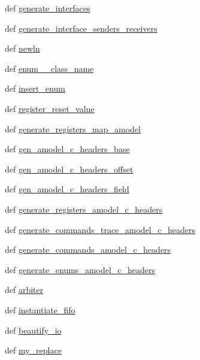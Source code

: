 \begin{DoxyCompactItemize}
\item 
def \hyperlink{namespaceverilog__generator_adc59aa695fe42f246df0ff8a0c3e785d}{generate\-\_\-interfaces}
\item 
def \hyperlink{namespaceverilog__generator_a6e58e2b5b632223307b65b5e8cd51028}{generate\-\_\-interface\-\_\-senders\-\_\-receivers}
\item 
def \hyperlink{namespaceverilog__generator_adb69d2091eb978318f0c6fc718fb13a4}{newln}
\item 
def \hyperlink{namespaceverilog__generator_a9e251dc21817ef0d79de794d38318fbb}{enum\-\_\-\_\-class\-\_\-name}
\item 
def \hyperlink{namespaceverilog__generator_a6cc005646e92f8b0aeeed3f441cdfa11}{insert\-\_\-enum}
\item 
def \hyperlink{namespaceverilog__generator_a1510db3a4ad74101fa56687347987bda}{register\-\_\-reset\-\_\-value}
\item 
def \hyperlink{namespaceverilog__generator_aa1702bb61a8a284ceb782528501d58b7}{generate\-\_\-registers\-\_\-map\-\_\-amodel}
\item 
def \hyperlink{namespaceverilog__generator_a3c57a6c2e7b44997ebc77a9705f56ec6}{gen\-\_\-amodel\-\_\-c\-\_\-headers\-\_\-base}
\item 
def \hyperlink{namespaceverilog__generator_ac37a4383316401f253d362156fe7f159}{gen\-\_\-amodel\-\_\-c\-\_\-headers\-\_\-offset}
\item 
def \hyperlink{namespaceverilog__generator_a065d3eb7df588932ffee2860e142abb4}{gen\-\_\-amodel\-\_\-c\-\_\-headers\-\_\-field}
\item 
def \hyperlink{namespaceverilog__generator_ab43f759f0bdf2c082390a88110092e93}{generate\-\_\-registers\-\_\-amodel\-\_\-c\-\_\-headers}
\item 
def \hyperlink{namespaceverilog__generator_a09f4962f360a3453496fbb9aecc154b7}{generate\-\_\-commands\-\_\-trace\-\_\-amodel\-\_\-c\-\_\-headers}
\item 
def \hyperlink{namespaceverilog__generator_a407a6d16ea507354f98156061a237cc7}{generate\-\_\-commands\-\_\-amodel\-\_\-c\-\_\-headers}
\item 
def \hyperlink{namespaceverilog__generator_a04093e2bab1b5ac3b1809a000cbb4792}{generate\-\_\-enums\-\_\-amodel\-\_\-c\-\_\-headers}
\item 
def \hyperlink{namespaceverilog__generator_a9116a9ecd3860faffaa5e390ccc8d361}{arbiter}
\item 
def \hyperlink{namespaceverilog__generator_a39ea44e38eb50d66f8ceeafd61d2c848}{instantiate\-\_\-fifo}
\item 
def \hyperlink{namespaceverilog__generator_a7507df63a0f85b2936f84cd64e62ce22}{beautify\-\_\-io}
\item 
def \hyperlink{namespaceverilog__generator_aaf544527848eccf8c9d510143b80eb98}{my\-\_\-replace}
\end{DoxyCompactItemize}
